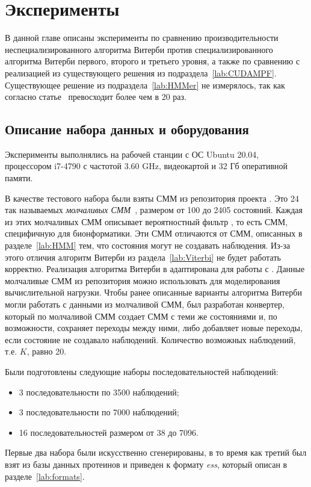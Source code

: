 \section{Эксперименты}
В данной главе описаны эксперименты по сравнению 
производительности неспециализированного алгоритма Витерби 
против специализированного алгоритма Витерби первого, второго 
и третьего уровня, а также по сравнению с реализацией из существующего решения  из 
подраздела~\ref{lab:CUDAMPF}.
Существующее решение  из подраздела~\ref{lab:HMMer} не измерялось, так как согласно статье~\cite{cudampf}  превосходит  более чем в 20 раз.

\subsection{Описание набора данных и оборудования}
Эксперименты выполнялись на рабочей станции с ОС Ubuntu 
20.04, процессором  i7-4790 с частотой 3.60 
GHz, видеокартой  и 32 Гб 
оперативной памяти.

В качестве тестового набора были взяты СММ из репозитория  
проекта .
Это 24 так называемых \emph{молчаливых СММ}~\cite{silentHMM}, 
размером от 100 до 2405 состояний.
Каждая из этих молчаливых СММ описывает вероятностный фильтр , то есть СММ, специфичную для бионформатики.
Эти СММ отличаются от СММ, описанных в разделе~\ref{lab:HMM} 
тем, что состояния могут не создавать наблюдения.
Из-за этого отличия алгоритм Витерби из 
раздела~\ref{lab:Viterbi} не будет работать корректно.
Реализация алгоритма Витерби в  адаптирована для работы с .
Данные молчаливые СММ из репозитория  можно использовать 
для моделирования вычислительной нагрузки.
Чтобы ранее описанные варианты алгоритма Витерби могли 
работать с данными из молчаливой СММ, был разработан 
конвертер, который по молчаливой СММ создает СММ с теми же 
состояниями и, по возможности, сохраняет переходы между ними, 
либо добавляет новые переходы, если состояние не создавало 
наблюдений.
Количество возможных наблюдений, т.е. $K$, равно 20.

Были подготовлены следующие наборы последовательностей наблюдений:
\begin{itemize}
	\item 3 последовательности по 3500 наблюдений;
	\item 3 последовательности по 7000 наблюдений;
	\item 16 последовательностей размером от 38 до 7096.
\end{itemize}
Первые два набора были искусственно сгенерированы, в то время 
как третий был взят из базы данных протеинов  и 
приведен к формату \emph{ess}, который описан в 
разделе~\ref{lab:formats}.


